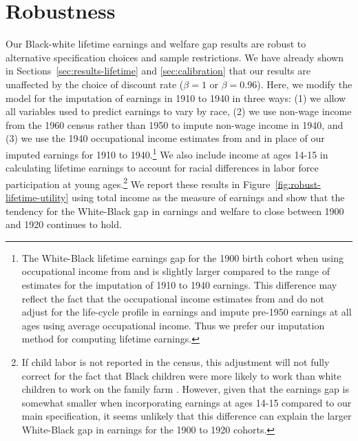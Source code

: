 \documentclass[12pt]{article}
\begin{document}

\section{Robustness\label{sec:robustness}}

Our Black-white lifetime earnings and welfare gap results are robust to alternative specification choices and sample restrictions. 
We have already shown in Sections~\ref{sec:results-lifetime} and \ref{sec:calibration} that our results are unaffected by the choice of discount rate ($\beta = 1$ or $\beta = 0.96$). 
Here, we modify the model for the imputation of earnings in 1910 to 1940 in three ways: (1) we allow all variables used to predict earnings to vary by race, (2) we use non-wage income from the 1960 census rather than 1950 to impute non-wage income in 1940, and (3) we use the 1940 occupational income estimates from  and  in place of our imputed earnings for 1910 to 1940.\footnote{The White-Black lifetime earnings gap for the 1900 birth cohort when using occupational income from   and  is slightly larger compared to the range of estimates for the imputation of 1910 to 1940 earnings. 
This difference may reflect the fact that the occupational income estimates from  and  do not adjust for the life-cycle profile in earnings and impute pre-1950 earnings at all ages using average occupational income. 
Thus we prefer our imputation method for computing lifetime earnings.}
We also include income at ages 14-15 in calculating lifetime earnings to account for racial differences in labor force participation at young ages.\footnote{If child labor is not reported in the census, this adjustment will not fully correct for the fact that Black children were more likely to work than white children to work on the family farm . 
However, given that the earnings gap is somewhat smaller when incorporating earnings at ages 14-15 compared to our main specification, it seems unlikely that this difference can explain the larger White-Black gap in earnings for the 1900 to 1920 cohorts.}
We report these results in Figure~\ref{fig:robust-lifetime-utility} using total income as the measure of earnings and show that the tendency for the White-Black gap in earnings and welfare to close between 1900 and 1920 continues to hold.  
\end{document}
